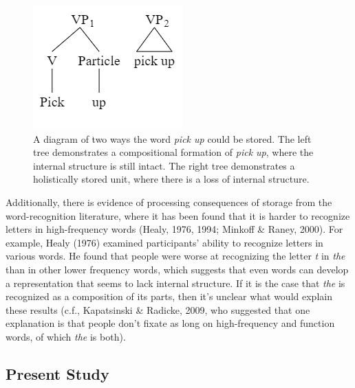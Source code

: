 \documentclass[
  man,floatsintext]{apa6}
\begin{document}
\begin{figure}

{\centering \includegraphics[width=0.3\linewidth]{Figures/syntax_tree} 

}

\caption{A diagram of two ways the word \emph{pick up} could be stored. The left tree demonstrates a compositional formation of \emph{pick up}, where the internal structure is still intact. The right tree demonstrates a holistically stored unit, where there is a loss of internal structure.}\label{fig:lossInternal}
\end{figure}

Additionally, there is evidence of processing consequences of storage from the word-recognition literature, where it has been found that it is harder to recognize letters in high-frequency words (Healy, 1976, 1994; Minkoff \& Raney, 2000). For example, Healy (1976) examined participants' ability to recognize letters in various words. He found that people were worse at recognizing the letter \emph{t} in \emph{the} than in other lower frequency words, which suggests that even words can develop a representation that seems to lack internal structure. If it is the case that \emph{the} is recognized as a composition of its parts, then it's unclear what would explain these results (c.f., Kapatsinski \& Radicke, 2009, who suggested that one explanation is that people don't fixate as long on high-frequency and function words, of which \emph{the} is both).

\hypertarget{present-study}{%
\subsection{Present Study}\label{present-study}}
\end{document}
